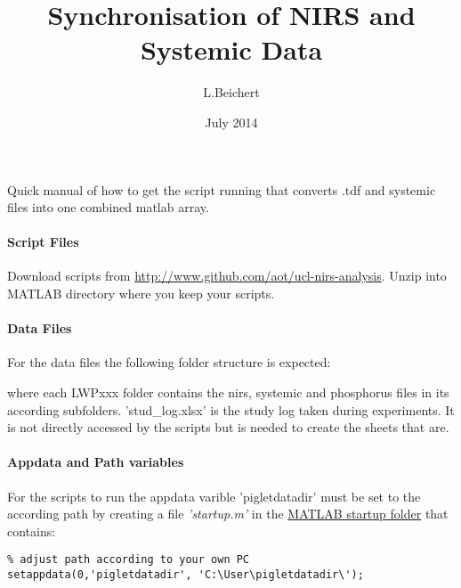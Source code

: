 \documentclass[10pt]{article}
\title{Synchronisation of NIRS and Systemic Data}
\author{L.Beichert}
\date{July 2014}
\begin{document}
\maketitle

Quick manual of how to get the script running that converts .tdf and systemic files into one combined matlab array.

\paragraph*{Script Files}
Download scripts from \url{http://www.github.com/aot/ucl-nirs-analysis}. 
Unzip into MATLAB directory where you keep your scripts.



\paragraph{Data Files}
For the data files the following folder structure is expected:


where each LWPxxx folder contains the nirs, systemic and phosphorus files in its according subfolders. 'stud\_log.xlsx' is the study log taken during experiments. 
It is not directly accessed by the scripts but is needed to create the sheets that are.

\paragraph{Appdata and Path variables}
For the scripts to run the appdata varible 'pigletdatadir' must be set to the according path by creating a file \emph{'startup.m'} in the 
\href{http://www.mathworks.co.uk/help/matlab/matlab_env/matlab-startup-folder.html}{MATLAB startup folder} that contains: 

\begin{lstlisting}
% adjust path according to your own PC
setappdata(0,'pigletdatadir', 'C:\User\pigletdatadir\');
\end{lstlisting}
\end{document}
